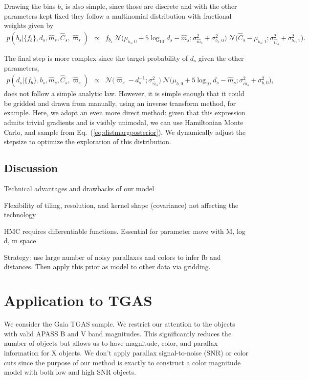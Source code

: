 \documentclass[aps,prd,showpacs,superscriptaddress,groupedaddress]{revtex4}  %
\newcommand{\equref}[1]{{\xspace}Eq.~(\ref{#1})}
\newcommand{\eqn}[1]{\begin{eqnarray}#1\end{eqnarray}}
\begin{document}
Drawing the bins $b_s$ is also simple, since those are discrete and with the other parameters kept fixed they follow a multinomial distribution with fractional weights given by
\eqn{
	p\left(b_s \bigr\rvert \bigl\{ f_b \bigr\}, d_s, \hat{m}_s, \hat{C}_s, \hat{\varpi}_s\right) &\propto& f_{b_s} \  \mathcal{N}\bigl( \mu_{b_s,0} + 5\log_{10}d_s  -\hat{m}_s ;\sigma_{\hat{m}_s}^2 + \sigma_{b_s,0}^2 \bigr) \  \mathcal{N}\bigl(\hat{C}_s - \mu_{b_s,1};\sigma_{\hat{C}_s}^2 + \sigma_{b_s,1}^2 \bigr).
}

The final step is more complex since the target probability of $d_s$ given the other parameters,
\eqn{
	p\left(d_s \bigr\rvert \bigl\{ f_b \bigr\}, b_s, \hat{m}_s, \hat{C}_s, \hat{\varpi}_s\right) &\propto&  \mathcal{N}\bigl(\hat{\varpi}_s - d_s^{-1};\sigma_{\hat{\varpi}_s}^2 \bigr) \  \mathcal{N}\bigl( \mu_{b,0} + 5\log_{10}d_s  -\hat{m}_s ;\sigma_{\hat{m}_s}^2 + \sigma_{b,0}^2 \bigr) ,\label{eq:distmargposterior}
}
does not follow a simple analytic law.
However, it is simple enough that it could be gridded and drawn from manually, using an inverse transform method, for example.
Here, we adopt an even more direct method: given that this expression admits trivial gradients and is visibly unimodal, we can use Hamiltonian Monte Carlo, and sample from \equref{eq:distmargposterior}. 
We dynamically adjust the stepsize to optimize the exploration of this distribution.


\subsection{Discussion}

Technical advantages and drawbacks of our model

Flexibility of tiling, resolution, and kernel shape (covariance) not affecting the technology

HMC requires differentiable functions. Essential for parameter move with M, log d, m space

Strategy: use large number of noisy parallaxes and colors to infer fb and distances.
Then apply this prior as model to other data via gridding.

\section{Application to TGAS}

We consider the Gaia TGAS sample. We restrict our attention to the objects with valid APASS B and V band magnitudes. 
This significantly reduces the number of objects but allows us to have magnitude, color, and parallax information for X objects. 
We don't apply parallax signal-to-noise (SNR) or color cuts since the purpose of our method is exactly to construct a color magnitude model with both low and high SNR objects. 
\end{document}

